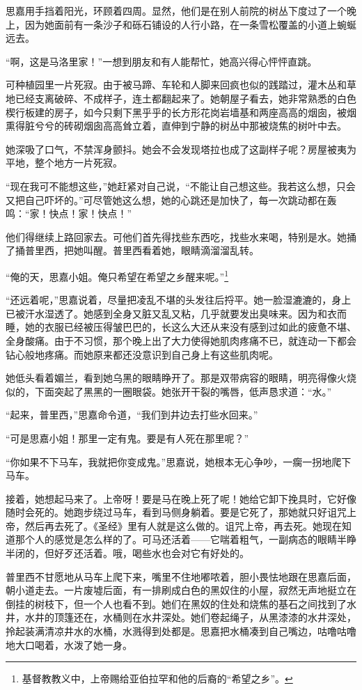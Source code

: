 \par 思嘉用手挡着阳光，环顾着四周。显然，他们是在别人前院的树丛下度过了一个晚上，因为她面前有一条沙子和砾石铺设的人行小路，在一条雪松覆盖的小道上蜿蜒远去。
\par “啊，这是马洛里家！”一想到朋友和有人能帮忙，她高兴得心怦怦直跳。
\par 可种植园里一片死寂。由于被马蹄、车轮和人脚来回疯也似的践踏过，灌木丛和草地已经支离破碎、不成样子，连土都翻起来了。她朝屋子看去，她非常熟悉的白色楔行板建的房子，如今只剩下黑乎乎的长方形花岗岩墙基和两座高高的烟囱，被烟熏得脏兮兮的砖砌烟囱高高耸立着，直伸到宁静的树丛中那被烧焦的树叶中去。
\par 她深吸了口气，不禁浑身颤抖。她会不会发现塔拉也成了这副样子呢？房屋被夷为平地，整个地方一片死寂。
\par “现在我可不能想这些，”她赶紧对自己说，“不能让自己想这些。我若这么想，只会又把自己吓坏的。”可尽管她这么想，她的心跳还是加快了，每一次跳动都在轰鸣：“家！快点！家！快点！”
\par 他们得继续上路回家去。可他们首先得找些东西吃，找些水来喝，特别是水。她捅了捅普里西，把她叫醒。普里西看着她，眼睛滴溜溜乱转。
\par “俺的天，思嘉小姐。俺只希望在希望之乡醒来呢。”\footnote{基督教教义中，上帝赐给亚伯拉罕和他的后裔的“希望之乡”。}
\par “还远着呢，”思嘉说着，尽量把凌乱不堪的头发往后捋平。她一脸湿漉漉的，身上已被汗水湿透了。她感到全身又脏又乱又粘，几乎就要发出臭味来。因为和衣而睡，她的衣服已经被压得皱巴巴的，长这么大还从来没有感到过如此的疲惫不堪、全身酸痛。由于不习惯，那个晚上出了大力使得她肌肉疼痛不已，就连动一下都会钻心般地疼痛。而她原来都还没意识到自己身上有这些肌肉呢。
\par 她低头看着媚兰，看到她乌黑的眼睛睁开了。那是双带病容的眼睛，明亮得像火烧似的，下面突起了黑黑的一圈眼袋。她张开干裂的嘴唇，低声恳求道：“水。”
\par “起来，普里西，”思嘉命令道，“我们到井边去打些水回来。”
\par “可是思嘉小姐！那里一定有鬼。要是有人死在那里呢？”
\par “你如果不下马车，我就把你变成鬼。”思嘉说，她根本无心争吵，一瘸一拐地爬下马车。
\par 接着，她想起马来了。上帝呀！要是马在晚上死了呢！她给它卸下挽具时，它好像随时会死的。她跑步绕过马车，看到马侧身躺着。要是它死了，那她就只好诅咒上帝，然后再去死了。《圣经》里有人就是这么做的。诅咒上帝，再去死。她现在知道那个人的感觉是怎么样的了。可马还活着——它喘着粗气，一副病态的眼睛半睁半闭的，但好歹还活着。哦，喝些水也会对它有好处的。
\par 普里西不甘愿地从马车上爬下来，嘴里不住地嘟哝着，胆小畏怯地跟在思嘉后面，朝小道走去。一片废墟后面，有一排刷成白色的黑奴住的小屋，寂然无声地挺立在倒挂的树枝下，但一个人也看不到。她们在黑奴的住处和烧焦的基石之间找到了水井，水井的顶篷还在，水桶则在水井深处。她们卷起绳子，从黑漆漆的水井深处，拎起装满清凉井水的水桶，水溅得到处都是。思嘉把水桶凑到自己嘴边，咕噜咕噜地大口喝着，水泼了她一身。
